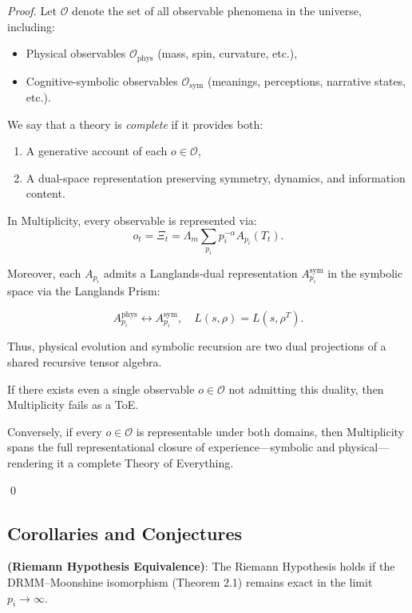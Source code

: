 \documentclass{article}
\theoremstyle{plain}
\begin{document}
\begin{proof}
Let \( \mathcal{O} \) denote the set of all observable phenomena in the universe, including:
\begin{itemize}
    \item Physical observables \( \mathcal{O}_{\text{phys}} \) (mass, spin, curvature, etc.),
    \item Cognitive-symbolic observables \( \mathcal{O}_{\text{sym}} \) (meanings, perceptions, narrative states, etc.).
\end{itemize}

We say that a theory is \textit{complete} if it provides both:
\begin{enumerate}
    \item A generative account of each \( o \in \mathcal{O} \),
    \item A dual-space representation preserving symmetry, dynamics, and information content.
\end{enumerate}

In Multiplicity, every observable is represented via:
\[
o_t = \Xi_t = \Lambda_m \sum_{p_i} p_i^{-\alpha} A_{p_i}(T_t).
\]

Moreover, each \( A_{p_i} \) admits a Langlands-dual representation \( A_{p_i}^{\text{sym}} \) in the symbolic space via the Langlands Prism:

\[
A_{p_i}^{\text{phys}} \longleftrightarrow A_{p_i}^{\text{sym}}, \quad L(s, \rho) = L(s, \rho^T).
\]

Thus, physical evolution and symbolic recursion are two dual projections of a shared recursive tensor algebra.

If there exists even a single observable \( o \in \mathcal{O} \) not admitting this duality, then Multiplicity fails as a ToE.

Conversely, if every \( o \in \mathcal{O} \) is representable under both domains, then Multiplicity spans the full representational closure of experience—symbolic and physical—rendering it a complete Theory of Everything.

\qed
\end{proof}

\subsection*{Corollaries and Conjectures}

\begin{corollary}
\textbf{(Riemann Hypothesis Equivalence)}: The Riemann Hypothesis holds if the DRMM–Moonshine isomorphism (Theorem 2.1) remains exact in the limit \( p_i \rightarrow \infty \).
\end{corollary}
\end{document}

